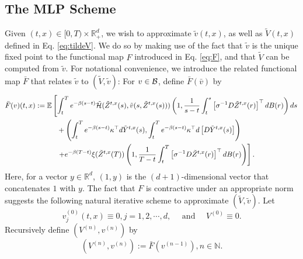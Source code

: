 \documentclass[11pt]{article}
\theoremstyle{definition}
\theoremstyle{plain}
\newcommand{\R}{\mathbb{R}}
\newcommand{\N}{\mathbb{N}}
\newcommand{\cB}{{\cal B}}
\newcommand{\cH}{{\cal H}}
\begin{document}
\subsection{The MLP Scheme}
Given $(t, x) \in [0, T)\times \R_+^d$, we wish to approximate $\tilde v(t,x)$, 
as well as $\tilde V(t,x)$ defined in Eq. \eqref{eq:tildeV}. 
We do so by making use of the fact that $\tilde v$ 
is the unique fixed point to the functional map $F$ introduced in Eq. \eqref{eq:F}, and 
that $\tilde V$ can be computed from $\tilde v$. 
For notational convenience, we introduce the related functional map $\bar F$ 
that relates $\tilde v$ to $(\tilde V, \tilde v)$: 
For $v \in \cB$, define $\bar F(\bar v)$ by
\begin{align}
\bar F(v)(t,x) & := \mathbb{E} \left[ \int_t^T e^{-\beta(s - t)} 
\tilde \cH(\tilde{Z}^{t,x}(s), \tilde{v}(s, \tilde{Z}^{t,x}(s))) 
\left( 1, \frac{1}{s - t} \int_t^s \left[\sigma^{-1} D \tilde{Z}^{t,x}(r)\right]^\top dB(r)  \right) ds \right. \nonumber \\
&\qquad \quad + \left(\int_t^T e^{-\beta(s - t)} \kappa^{\top} d\tilde Y^{t,x}(s), \int_t^T e^{-\beta(s-t)} \kappa^{\top} d\left[D\tilde Y^{t,x}(s)\right]\right) \nonumber \\
&\qquad \quad \left. + e^{-\beta(T - t)} \xi(\tilde{Z}^{t,x}(T)) 
\left( 1, \frac{1}{T - t} \int_t^T \left[\sigma^{-1} D \tilde{Z}^{t,x}(r)\right]^\top dB(r) \right) \right].
\label{eq:barF}
\end{align}
Here, for a vector $y \in \R^d$, $(1, y)$ is the $(d+1)$-dimensional vector that concatenates $1$ with $y$. 
The fact that $F$ is contractive under an appropriate norm
suggests the following natural iterative scheme to approximate $(\tilde V, \tilde v)$. 
Let
\begin{equation}\label{eq:initial}
v^{(0)}_j(t,x) \equiv 0, j=1, 2, \cdots, d, \quad \text{ and } \quad V^{(0)} \equiv 0.
\end{equation}
Recursively define $(V^{(n)}, v^{(n)})$ by
\begin{equation}\label{eq:iterations}
(V^{(n)}, v^{(n)}) := \bar F\left(v^{(n-1)}\right), n\in \N.
\end{equation}
\end{document}
